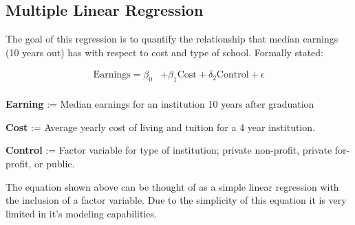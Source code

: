 \documentclass[%
 reprint,
 amsmath,amssymb,
 aps,
]{revtex4-1}
\begin{document}
\subsection{\label{sec:level2} Multiple Linear Regression}
The goal of this regression is to quantify the relationship that median earnings (10 years out) has with respect to cost and type of school. Formally stated: 

\begin{align*}
	\mathrm{Earnings} = \beta_{0} 
    &+ \beta_{1}  \mathrm{Cost} + \delta_{2}  \mathrm{Control} + \epsilon\\
\end{align*}

\textbf{Earning} := Median earnings for an institution 10 years after graduation

\textbf{Cost} := Average yearly cost of living and tuition for a 4 year institution.

\textbf{Control} := Factor variable for type of institution; private non-profit, private for-profit, or public.

\vspace{2mm}

The equation shown above can be thought of as a simple linear regression with the inclusion of a factor variable.  Due to the simplicity of this equation it is very limited in it's modeling capabilities. 
\end{document}
